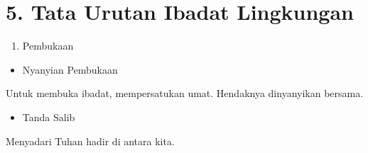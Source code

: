 \documentclass{article}
\begin{document}
\section[5. Tata Urutan Ibadat Lingkungan]{5. Tata Urutan Ibadat
Lingkungan}
\begin{enumerate}
\item \begin{description}
\item[Pembukaan]
\end{description}
\end{enumerate}
\begin{itemize}
\item \begin{description}
\item[Nyanyian Pembukaan]
\end{description}
\end{itemize}
Untuk membuka ibadat, mempersatukan umat. Hendaknya dinyanyikan bersama.

\begin{itemize}
\item \begin{description}
\item[Tanda Salib]
\end{description}
\end{itemize}
Menyadari Tuhan hadir di antara kita.
\end{document}
